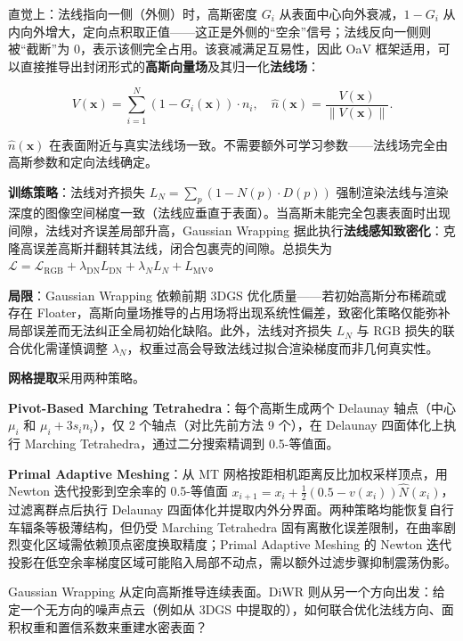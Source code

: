 直觉上：法线指向一侧（外侧）时，高斯密度 $G_i$ 从表面中心向外衰减，$1-G_i$ 从内向外增大，定向点积取正值——这正是外侧的“空余”信号；法线反向一侧则被“截断”为 0，表示该侧完全占用。该衰减满足互易性，因此 OaV 框架适用，可以直接推导出封闭形式的\textbf{高斯向量场}及其归一化\textbf{法线场}：

\begin{equation*}
V(\mathbf{x}) = \sum_{i=1}^{N} (1 - G_i(\mathbf{x})) \cdot n_i, \quad \hat{n}(\mathbf{x}) = \frac{V(\mathbf{x})}{\|V(\mathbf{x})\|}.
\end{equation*}

$\hat{n}(\mathbf{x})$ 在表面附近与真实法线场一致。不需要额外可学习参数——法线场完全由高斯参数和定向法线确定。

\textbf{训练策略}：法线对齐损失 $L_N = \sum_p (1 - N(p) \cdot D(p))$ 强制渲染法线与渲染深度的图像空间梯度一致（法线应垂直于表面）。当高斯未能完全包裹表面时出现间隙，法线对齐误差局部升高，Gaussian Wrapping 据此执行\textbf{法线感知致密化}：克隆高误差高斯并翻转其法线，闭合包裹壳的间隙。总损失为 $\mathcal{L} = \mathcal{L}_{\text{RGB}} + \lambda_{\text{DN}} L_{\text{DN}} + \lambda_N L_N + L_{\text{MV}}$。

\textbf{局限}：Gaussian Wrapping 依赖前期 3DGS 优化质量——若初始高斯分布稀疏或存在 Floater，高斯向量场推导的占用场将出现系统性偏差，致密化策略仅能弥补局部误差而无法纠正全局初始化缺陷。此外，法线对齐损失 $L_N$ 与 RGB 损失的联合优化需谨慎调整 $\lambda_N$，权重过高会导致法线过拟合渲染梯度而非几何真实性。

\textbf{网格提取}采用两种策略。

\textbf{Pivot-Based Marching Tetrahedra}：每个高斯生成两个 Delaunay 轴点（中心 $\mu_i$ 和 $\mu_i + 3s_i n_i$），仅 2 个轴点（对比先前方法 9 个），在 Delaunay 四面体化上执行 Marching Tetrahedra，通过二分搜索精调到 0.5-等值面。

\textbf{Primal Adaptive Meshing}：从 MT 网格按距相机距离反比加权采样顶点，用 Newton 迭代投影到空余率的 0.5-等值面 $x_{i+1} = x_i + \frac{1}{2}(0.5 - v(x_i))\hat{N}(x_i)$，过滤离群点后执行 Delaunay 四面体化并提取内外分界面。两种策略均能恢复自行车辐条等极薄结构，但仍受 Marching Tetrahedra 固有离散化误差限制，在曲率剧烈变化区域需依赖顶点密度换取精度；Primal Adaptive Meshing 的 Newton 迭代投影在低空余率梯度区域可能陷入局部不动点，需以额外过滤步骤抑制震荡伪影。

Gaussian Wrapping 从定向高斯推导连续表面。DiWR 则从另一个方向出发：给定一个无方向的噪声点云（例如从 3DGS 中提取的），如何联合优化法线方向、面积权重和置信系数来重建水密表面？


